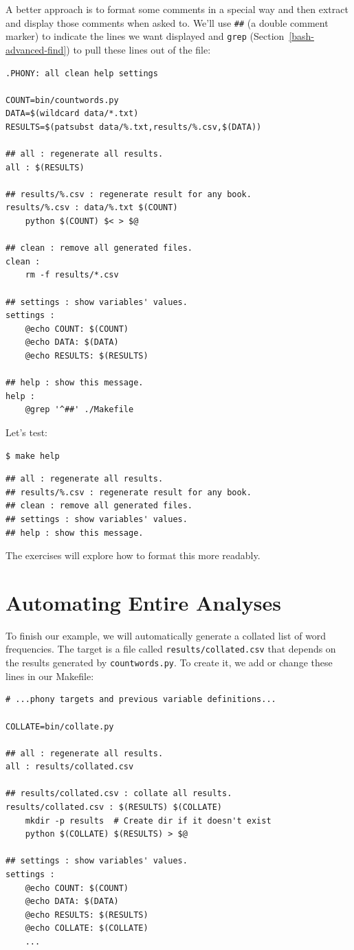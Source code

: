 \documentclass[
]{krantz}
\begin{document}
A better approach is to format some comments in a special way
and then extract and display those comments when asked to.
We'll use \texttt{\#\#} (a double comment marker) to indicate the lines we want displayed
and \texttt{grep} (Section~\ref{bash-advanced-find}) to pull these lines out of the file:

\begin{verbatim}
.PHONY: all clean help settings

COUNT=bin/countwords.py
DATA=$(wildcard data/*.txt)
RESULTS=$(patsubst data/%.txt,results/%.csv,$(DATA))

## all : regenerate all results.
all : $(RESULTS)

## results/%.csv : regenerate result for any book.
results/%.csv : data/%.txt $(COUNT)
    python $(COUNT) $< > $@

## clean : remove all generated files.
clean :
    rm -f results/*.csv

## settings : show variables' values.
settings :
    @echo COUNT: $(COUNT)
    @echo DATA: $(DATA)
    @echo RESULTS: $(RESULTS)

## help : show this message.
help :
    @grep '^##' ./Makefile
\end{verbatim}

Let's test:

\begin{verbatim}
$ make help
\end{verbatim}

\begin{verbatim}
## all : regenerate all results.
## results/%.csv : regenerate result for any book.
## clean : remove all generated files.
## settings : show variables' values.
## help : show this message.
\end{verbatim}

The exercises will explore how to format this more readably.

\hypertarget{automate-pipeline}{%
\section{Automating Entire Analyses}\label{automate-pipeline}}

To finish our example,
we will automatically generate a collated list of word frequencies.
The target is a file called \texttt{results/collated.csv}
that depends on the results generated by \texttt{countwords.py}.
To create it,
we add or change these lines in our Makefile:

\begin{verbatim}
# ...phony targets and previous variable definitions...

COLLATE=bin/collate.py

## all : regenerate all results.
all : results/collated.csv

## results/collated.csv : collate all results.
results/collated.csv : $(RESULTS) $(COLLATE)
    mkdir -p results  # Create dir if it doesn't exist
    python $(COLLATE) $(RESULTS) > $@

## settings : show variables' values.
settings :
    @echo COUNT: $(COUNT)
    @echo DATA: $(DATA)
    @echo RESULTS: $(RESULTS)
    @echo COLLATE: $(COLLATE)
    ...
\end{verbatim}
\end{document}
